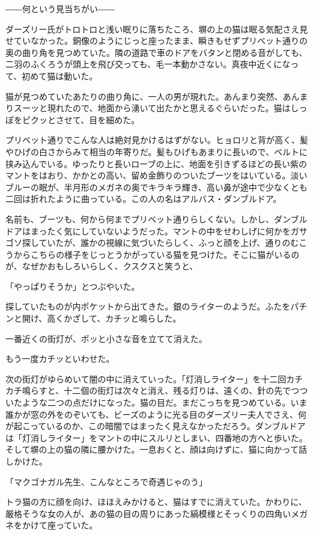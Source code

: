 \documentclass[10pt,a4paper]{article}
\begin{document}
\begin{CJK}{UTF8}{min}
――何という見当ちがい――

ダーズリー氏がトロトロと浅い眠りに落ちたころ、塀の上の猫は眠る気配さえ見せていなかった。銅像のようにじっと座ったまま、瞬きもせずプリベット通りの奥の曲り角を見つめていた。隣の道路で車のドアをバタンと閉める音がしても、二羽のふくろうが頭上を飛び交っても、毛一本動かさない。真夜中近くになって、初めて猫は動いた。

猫が見つめていたあたりの曲り角に、一人の男が現れた。あんまり突然、あんまりスーッと現れたので、地面から湧いて出たかと思えるぐらいだった。猫はしっぽをピクッとさせて、目を細めた。

プリベット通りでこんな人は絶対見かけるはずがない。ヒョロリと背が高く、髪やひげの白さからみて相当の年寄りだ。髪もひげもあまりに長いので、ベルトに挟み込んでいる。ゆったりと長いローブの上に、地面を引きずるほどの長い紫のマントをはおり、かかとの高い、留め金飾りのついたブーツをはいている。淡いブルーの眠が、半月形のメガネの奥でキラキラ輝き、高い鼻が途中で少なくとも二回は折れたように曲っている。この人の名はアルバス・ダンブルドア。

名前も、ブーツも、何から何までプリベット通りらしくない。しかし、ダンブルドアはまったく気にしていないようだった。マントの中をせわしげに何かをガサゴソ探していたが、誰かの視線に気づいたらしく、ふっと顔を上げ、通りのむこうからこちらの様子をじっとうかがっている猫を見つけた。そこに猫がいるのが、なぜかおもしろいらしく、クスクスと笑うと、

「やっぱりそうか」とつぶやいた。

探していたものが内ポケットから出てきた。銀のライターのようだ。ふたをパチンと開け、高くかざして、カチッと鳴らした。

一番近くの街灯が、ポッと小さな音を立てて消えた。

もう一度カチッといわせた。

次の街灯がゆらめいて闇の中に消えていった。「灯消しライター」を十二回カチカチ鳴らすと、十二個の街灯は次々と消え、残る灯りは、遠くの、針の先でつついたような二つの点だけになった。猫の目だ。まだこっちを見つめている。いま誰かが窓の外をのぞいても、ビーズのように光る目のダーズリー夫人でさえ、何が起こっているのか、この暗闇ではまったく見えなかっただろう。ダンブルドアは「灯消しライター」をマントの中にスルリとしまい、四番地の方へと歩いた。そして塀の上の猫の隣に腰かけた。一息おくと、顔は向けずに、猫に向かって話しかけた。

「マクゴナガル先生、こんなところで奇遇じゃのう」

トラ猫の方に顔を向け、ほほえみかけると、猫はすでに消えていた。かわりに、厳格そうな女の人が、あの猫の目の周りにあった縞模様とそっくりの四角いメガネをかけて座っていた。


\end{CJK}
\end{document}

